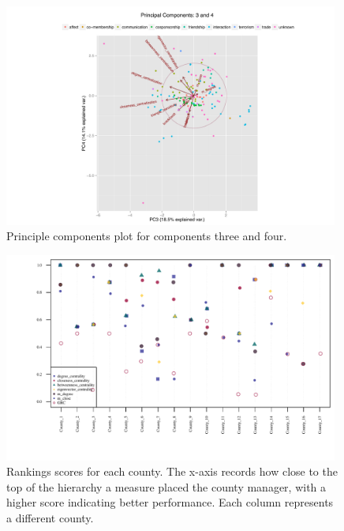 \documentclass[3p,times]{elsarticle}
\begin{document}
\begin{figure}
\begin{center}
	\caption{\label{fig:3 and 4} Principle components plot for components three and four.}
		\includegraphics[width = 0.98\textwidth]{./images/Observed_PCA_Components3_4.pdf}
\end{center}
\end{figure}

\begin{figure}
\begin{center}
	\caption{\label{fig:rankings each county} Rankings scores for each county. The x-axis records how close to the top of the hierarchy a measure placed the county manager, with a higher score indicating better performance. Each column represents a different county.}
		\includegraphics[width = 0.98\textwidth]{./images/Measure_Scores.pdf}
\end{center}
\end{figure}
\end{document}

